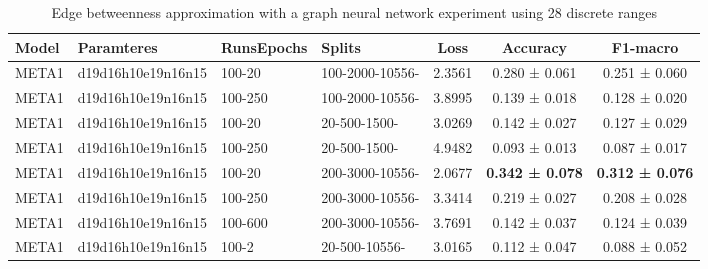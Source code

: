 \begin{table}[H]
\centering
\begin{tabular}{|llllccc|}
\hline
 Model &                                                                          Paramteres  &  Runs\/Epochs  &  Splits &    Loss &        Accuracy &        F1-macro  \\
\hline
 META1 &      d19d16h10e19n16n15 & 100-20 & 100-2000-10556- &  2.3561 &   0.280 ± 0.061 &   0.251 ± 0.060  \\
 META1 &     d19d16h10e19n16n15 & 100-250 & 100-2000-10556- &  3.8995 &   0.139 ± 0.018 &   0.128 ± 0.020  \\
 META1 &         d19d16h10e19n16n15 & 100-20 & 20-500-1500- &  3.0269 &   0.142 ± 0.027 &   0.127 ± 0.029  \\
 META1 &        d19d16h10e19n16n15 & 100-250 & 20-500-1500- &  4.9482 &   0.093 ± 0.013 &   0.087 ± 0.017  \\
 META1 &      d19d16h10e19n16n15 & 100-20 & 200-3000-10556- &  2.0677 &  \textbf{ 0.342 ± 0.078} &   \textbf{0.312 ± 0.076 } \\
 META1 &     d19d16h10e19n16n15 & 100-250 & 200-3000-10556- &  3.3414 &   0.219 ± 0.027 &   0.208 ± 0.028  \\
 META1 &    d19d16h10e19n16n15 & 100-600 & 200-3000-10556- &  3.7691 &   0.142 ± 0.037 &   0.124 ± 0.039  \\
 META1 &    d19d16h10e19n16n15 & 100-2 & 20-500-10556- &  3.0165 &   0.112 ± 0.047 &   0.088 ± 0.052 \\
\hline
\end{tabular}
\label{Experiment1-v2}\caption{Edge betweenness approximation with a graph neural network experiment using 28 discrete ranges}
\end{table} 






